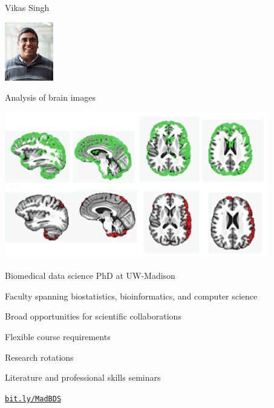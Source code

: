 \documentclass[12pt,t,aspectratio=169]{beamer}
\begin{document}
\begin{frame}{Vikas Singh}

\hspace*{0.85\textwidth}
\includegraphics[height=1in]{Pics/vikas_singh.jpg}
\vspace*{-30mm}

{\large Analysis of brain images}

\bigskip

\includegraphics[height=64mm]{Pics/vikas_brains.png}


\end{frame}



\begin{frame}{Biomedical data science PhD at UW-Madison}

    \bbi
  \item Faculty spanning biostatistics, bioinformatics, and computer
    science
  \item Broad opportunities for scientific collaborations
  \item Flexible course requirements
  \item Research rotations
  \item Literature and professional skills seminars
    \ei


\bigskip \bigskip

\centerline{\href{https://bit.ly/MadBDS}{\Large \tt bit.ly/MadBDS}}

\end{frame}
\end{document}
